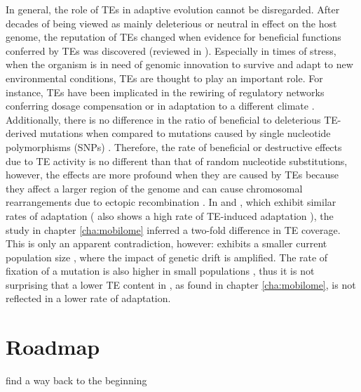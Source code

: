 In general, the role of TEs in adaptive evolution cannot be disregarded.
After decades of being viewed as mainly deleterious or neutral in effect
on the host genome, the reputation of TEs changed when evidence for
beneficial functions conferred by TEs was discovered (reviewed in
\citet{Oliver2012, Fedoroff2013}). Especially in times of stress, when
the organism is in need of genomic innovation to survive and adapt to
new environmental conditions, TEs are thought to play an important role.
For instance, TEs have been implicated in the rewiring of regulatory
networks conferring dosage compensation \citep{Ellison2013, Chuong2016}
or in adaptation to a different climate \citep{Gonzalez2010}.
Additionally, there is no difference in the ratio of beneficial to
deleterious TE-derived mutations when compared to mutations caused by
single nucleotide polymorphisms (SNPs) \citep{Akagi2013, Barron2014}.
Therefore, the rate of beneficial or destructive effects due to TE
activity is no different than that of random nucleotide substitutions,
however, the effects are more profound when they are caused by TEs
because they affect a larger region of the genome and can cause
chromosomal rearrangements due to ectopic recombination \citep{Gray2000,
Fiston-Lavier2007}. In  and , which exhibit similar rates of adaptation \citep{Bachtrog2008}
( also shows a high rate of TE-induced
adaptation \citep{Gonzalez2008}), the study in chapter
\ref{cha:mobilome} inferred a two-fold difference in TE coverage. This
is only an apparent contradiction, however: 
exhibits a smaller current population size \citep{Bachtrog2008}, where
the impact of genetic drift is amplified. The rate of fixation of a
mutation is also higher in small populations \citep{Kimura1969}, thus it
is not surprising that a lower TE content in , as
found in chapter \ref{cha:mobilome}, is not reflected in a lower rate of
adaptation.

\section{Roadmap}

find a way back to the beginning
